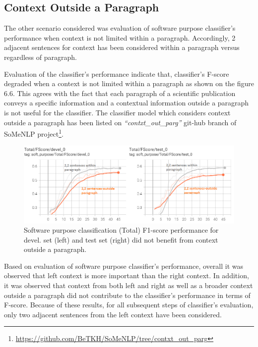 \subsection{Context Outside a Paragraph}
\label{sec:chapter06:contxtOutside}


The other scenario considered was evaluation of software purpose classifier's performance when context is not limited within a paragraph. Accordingly, 2 adjacent sentences for context has been considered within a paragraph versus regardless of paragraph. 

Evaluation of the classifier's performance indicate that, classifier’s F-score degraded when a context is not limited within a paragraph as shown on the figure 6.6. This agrees with the fact that each paragraph of a scientific publication conveys a specific information and a contextual information outside a paragraph is not useful for the classifier.  The classifier model which considers context outside a paragraph has been listed on \emph{“contxt\_out\_parg”} git-hub branch of SoMeNLP project\footnote{\url{https://github.com/BeTKH/SoMeNLP/tree/contxt_out_parg}}. \\

\begin{figure}[htbp]
	\centering
	\includegraphics[width=.90\textwidth]{4.graphics/figures/ch_6/2.left_context_vs_right/HD/Fscore_outside_paragrapgh_vs_inside}
	\caption{Software purpose classification (Total) F1-score performance for devel. set (left) and test set (right) did not benefit from context outside a paragraph. }
	\label{fig:chapter06:with}
\end{figure}


Based on evaluation of software purpose classifier's performance, overall it was observed that left context is more important than the right context. In addition, it was observed that context from both left and right as well as a broader context outside a paragraph did not contribute to the classifier's performance in terms of F-score. Because of these results, for all subsequent steps of classifier's evaluation, only two adjacent sentences from the left context have been considered. \\


